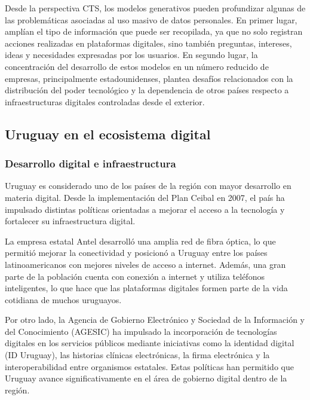 \documentclass[11pt,a4paper]{article}
\begin{document}
Desde la perspectiva CTS, los modelos generativos pueden profundizar algunas de las problemáticas asociadas al uso masivo de datos personales. En primer lugar, amplían el tipo de información que puede ser recopilada, ya que no solo registran acciones realizadas en plataformas digitales, sino también preguntas, intereses, ideas y necesidades expresadas por los usuarios. En segundo lugar, la concentración del desarrollo de estos modelos en un número reducido de empresas, principalmente estadounidenses, plantea desafíos relacionados con la distribución del poder tecnológico y la dependencia de otros países respecto a infraestructuras digitales controladas desde el exterior.

\subsection{Uruguay en el ecosistema digital}

\subsubsection{Desarrollo digital e infraestructura}

Uruguay es considerado uno de los países de la región con mayor desarrollo en materia digital. Desde la implementación del Plan Ceibal en 2007, el país ha impulsado distintas políticas orientadas a mejorar el acceso a la tecnología y fortalecer su infraestructura digital.

La empresa estatal Antel desarrolló una amplia red de fibra óptica, lo que permitió mejorar la conectividad y posicionó a Uruguay entre los países latinoamericanos con mejores niveles de acceso a internet. Además, una gran parte de la población cuenta con conexión a internet y utiliza teléfonos inteligentes, lo que hace que las plataformas digitales formen parte de la vida cotidiana de muchos uruguayos.

Por otro lado, la Agencia de Gobierno Electrónico y Sociedad de la Información y del Conocimiento (AGESIC) ha impulsado la incorporación de tecnologías digitales en los servicios públicos mediante iniciativas como la identidad digital (ID Uruguay), las historias clínicas electrónicas, la firma electrónica y la interoperabilidad entre organismos estatales. Estas políticas han permitido que Uruguay avance significativamente en el área de gobierno digital dentro de la región.
\end{document}
